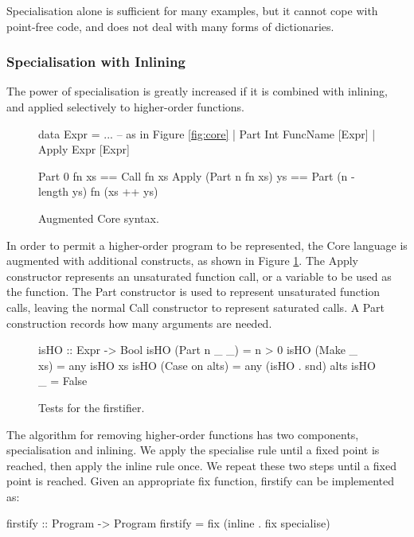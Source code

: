 \documentclass[preprint]{sigplanconf}
\newcommand{\C}[1]{\textsf{#1}}
\begin{document}
Specialisation alone is sufficient for many examples, but it cannot cope with point-free code, and does not deal with many forms of dictionaries.

\subsubsection{Specialisation with Inlining}

The power of specialisation is greatly increased if it is combined with inlining, and applied selectively to higher-order functions.

\begin{figure}
\begin{code}
data Expr  =  ... -- as in Figure {\ref{fig:core}}
           |  Part   Int FuncName [Expr]
           |  Apply  Expr [Expr]

Part 0 fn xs == Call fn xs
Apply (Part n fn xs) ys == Part (n - length ys) fn (xs ++ ys)
\end{code}
\caption{Augmented Core syntax.}
\label{fig:core_ho}
\end{figure}

In order to permit a higher-order program to be represented, the Core language is augmented with additional constructs, as shown in Figure \ref{fig:core_ho}. The \C{Apply} constructor represents an unsaturated function call, or a variable to be used as the function. The \C{Part} constructor is used to represent unsaturated function calls, leaving the normal \C{Call} constructor to represent saturated calls. A \C{Part} construction records how many arguments are needed.

\begin{figure}
\begin{code}
isHO :: Expr -> Bool
isHO (Part n _ _)    = n > 0
isHO (Make _ xs)     = any isHO xs
isHO (Case on alts)  = any (isHO . snd) alts
isHO _               = False
\end{code}
\caption{Tests for the firstifier.}
\label{fig:isHO}
\end{figure}

The algorithm for removing higher-order functions has two components, specialisation and inlining. We apply the specialise rule until a fixed point is reached, then apply the inline rule once. We repeat these two steps until a fixed point is reached. Given an appropriate \C{fix} function, \C{firstify} can be implemented as:

\begin{code}
firstify :: Program -> Program
firstify = fix (inline . fix specialise)
\end{code}
\end{document}
